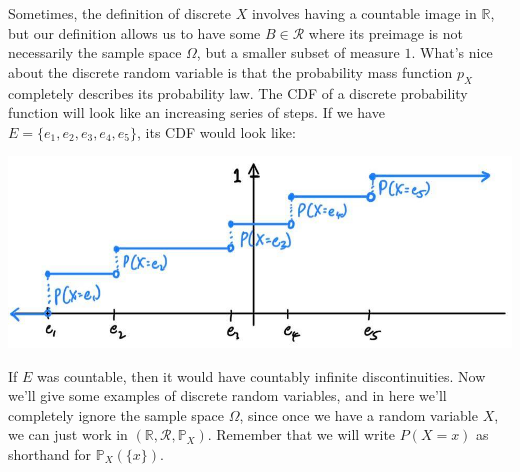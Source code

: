     Sometimes, the definition of discrete $X$ involves having a countable image in $\mathbb{R}$, but our definition allows us to have some $B \in \mathcal{R}$ where its preimage is not necessarily the sample space $\Omega$, but a smaller subset of measure $1$. What's nice about the discrete random variable is that the probability mass function $p_X$ completely describes its probability law. The CDF of a discrete probability function will look like an increasing series of steps. If we have $E = \{e_1, e_2, e_3, e_4, e_5\}$, its CDF would look like: 
    \begin{center}
      \includegraphics[scale=0.25]{img/Discrete_CDF.jpg}
    \end{center}
    If $E$ was countable, then it would have countably infinite discontinuities. Now we'll give some examples of discrete random variables, and in here we'll completely ignore the sample space $\Omega$, since once we have a random variable $X$, we can just work in $(\mathbb{R}, \mathcal{R}, \mathbb{P}_X)$. Remember that we will write $P(X = x)$ as shorthand for $\mathbb{P}_X (\{x\})$. 

